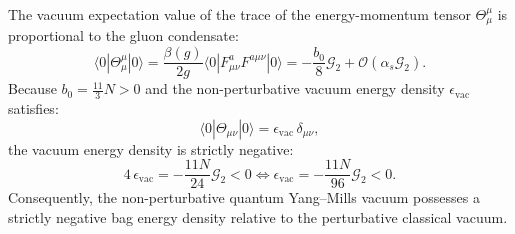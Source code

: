 \begin{proposition}
\label{prop:condensate_trace}
The vacuum expectation value of the trace of the energy-momentum tensor $\Theta_\mu^\mu$ is proportional to the gluon condensate:
\begin{equation}
\label{eq:trace_condensate_relation}
\langle 0 | \Theta_\mu^\mu | 0 \rangle = \frac{\beta(g)}{2g} \langle 0 | F_{\mu\nu}^a F^{a\mu\nu} | 0 \rangle = -\frac{b_0}{8} \mathcal{G}_2 + \mathcal{O}(\alpha_s \mathcal{G}_2).
\end{equation}
Because $b_0 = \frac{11}{3} N > 0$ and the non-perturbative vacuum energy density $\epsilon_{\mathrm{vac}}$ satisfies:
\begin{equation}
\label{eq:vacuum_em_tensor}
\langle 0 | \Theta_{\mu\nu} | 0 \rangle = \epsilon_{\mathrm{vac}} \, \delta_{\mu\nu},
\end{equation}
the vacuum energy density is strictly negative:
\begin{equation}
\label{eq:bag_energy_density}
4 \, \epsilon_{\mathrm{vac}} = -\frac{11 N}{24} \mathcal{G}_2 < 0 \iff \epsilon_{\mathrm{vac}} = -\frac{11 N}{96} \mathcal{G}_2 < 0.
\end{equation}
Consequently, the non-perturbative quantum Yang--Mills vacuum possesses a strictly negative bag energy density relative to the perturbative classical vacuum.
\end{proposition}

